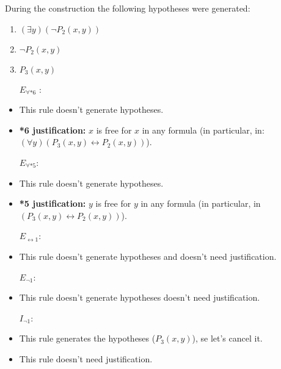 \documentclass{article}
\begin{document}
During the construction the following hypotheses were generated:
\begin{enumerate}
\item $(\exists y)(\neg P_2 (x, y))$
\item $\neg P_2 (x, y)$
\item $P_3 (x, y)$
\end{enumerate}

\noindent{}
\begin{itemize}
  \item [$E_{\forall *6}$]:
  \item This rule doesn't generate hypotheses.
  \item \textbf{*6 justification:} $x$ is free for $x$ in any formula (in particular, in: $(\forall y)(P_3 (x,y) \leftrightarrow P_2 (x,y))$).
\end{itemize}

\begin{itemize}
  \item [$E_{\forall *5}$:]
  \item This rule doesn't generate hypotheses.
  \item \textbf{*5 justification:} $y$ is free for $y$ in any formula (in particular, in $(P_3 (x,y) \leftrightarrow P_2 (x,y))$). 
\end{itemize}

\begin{itemize}
  \item [$E_{\leftrightarrow 1}$:]
  \item This rule doesn't generate hypotheses and doesn't need justification. 
\end{itemize}

\begin{itemize}
  \item [$E_{\neg 1}$:]
  \item This rule doesn't generate hypotheses doesn't need justification.
\end{itemize}
\newpage

\begin{itemize}
  \item [$I_{\neg 1}$:]
  \item This rule generates the hypotheses ($P_3 (x, y)$), se let's cancel it.
  \item This rule doesn't need justification.\\
\end{itemize}
\end{document}
